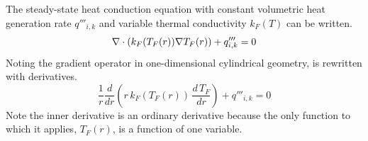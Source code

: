       The steady-state heat conduction equation with constant volumetric heat
      generation rate $q'''_{i,k}$ and variable thermal conductivity $k_F(T)$ 
      can be written.
      \begin{equation}
        \label{eq:conduction_fuel}
        \mathbf{\nabla} \cdot (k_F(T_F(r)) \mathbf{\nabla} T_F(r)) + q'''_{i,k} = 0
      \end{equation}
      Noting the gradient operator in one-dimensional cylindrical geometry,
       is rewritten with derivatives.
      \begin{equation}
        \label{eq:conduction_fuel_cylindrical}
        \frac{1}{r} \frac{d}{dr} \left( r \, k_F(T_F(r)) \, 
          \frac{d \, T_F}{dr} \right) + q'''_{i,k} = 0
      \end{equation}
      Note the inner derivative is an ordinary derivative because the only
      function to which it applies, $T_F(r)$, is a function of one variable. 


